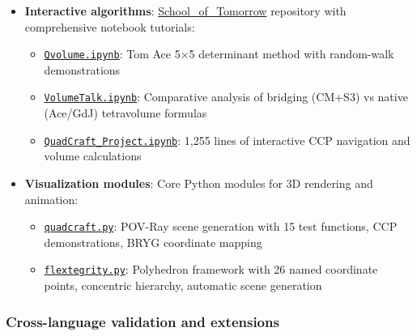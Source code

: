 \documentclass[
  10pt,
]{article}
\providecommand{\tightlist}{%
  \setlength{\itemsep}{0pt}\setlength{\parskip}{0pt}}
\begin{document}
\begin{itemize}
\tightlist
\item
  \textbf{Interactive algorithms}:
  \href{https://github.com/4dsolutions/School_of_Tomorrow}{School\_of\_Tomorrow}
  repository with comprehensive notebook tutorials:

  \begin{itemize}
  \tightlist
  \item
    \href{https://github.com/4dsolutions/School_of_Tomorrow/blob/master/Qvolume.ipynb}{\texttt{Qvolume.ipynb}}:
    Tom Ace 5×5 determinant method with random-walk demonstrations
  \item
    \href{https://github.com/4dsolutions/School_of_Tomorrow/blob/master/VolumeTalk.ipynb}{\texttt{VolumeTalk.ipynb}}:
    Comparative analysis of bridging (CM+S3) vs native (Ace/GdJ)
    tetravolume formulas
  \item
    \href{https://github.com/4dsolutions/School_of_Tomorrow/blob/master/QuadCraft_Project.ipynb}{\texttt{QuadCraft\_Project.ipynb}}:
    1,255 lines of interactive CCP navigation and volume calculations
  \end{itemize}
\item
  \textbf{Visualization modules}: Core Python modules for 3D rendering
  and animation:

  \begin{itemize}
  \tightlist
  \item
    \href{https://github.com/4dsolutions/School_of_Tomorrow/blob/master/quadcraft.py}{\texttt{quadcraft.py}}:
    POV-Ray scene generation with 15 test functions, CCP demonstrations,
    BRYG coordinate mapping
  \item
    \href{https://github.com/4dsolutions/School_of_Tomorrow/blob/master/flextegrity.py}{\texttt{flextegrity.py}}:
    Polyhedron framework with 26 named coordinate points, concentric
    hierarchy, automatic scene generation
  \end{itemize}
\end{itemize}

\hypertarget{cross-language-validation-and-extensions}{%
\subsubsection{Cross-language validation and
extensions}\label{cross-language-validation-and-extensions}}
\end{document}
